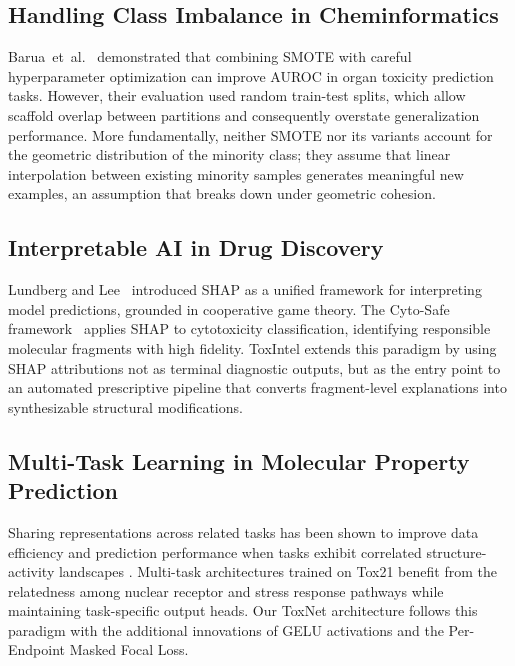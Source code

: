 \documentclass[lettersize,journal]{IEEEtran}
\begin{document}
  \subsection{Handling Class Imbalance in Cheminformatics}
  Barua~et~al.~\cite{barua} demonstrated that combining SMOTE with careful
  hyperparameter optimization can improve AUROC in organ toxicity prediction tasks.
  However, their evaluation used random train-test splits, which allow scaffold
  overlap between partitions and consequently overstate generalization performance.
  More fundamentally, neither SMOTE nor its variants account for the geometric
  distribution of the minority class; they assume that linear interpolation
  between existing minority samples generates meaningful new examples,
  an assumption that breaks down under geometric cohesion.

  \subsection{Interpretable AI in Drug Discovery}
  Lundberg and Lee~\cite{lundberg2017} introduced SHAP as a unified framework for
  interpreting model predictions, grounded in cooperative game theory.
  The Cyto-Safe framework~\cite{feitosa} applies SHAP to cytotoxicity classification,
  identifying responsible molecular fragments with high fidelity.
  ToxIntel extends this paradigm by using SHAP attributions not as terminal
  diagnostic outputs, but as the entry point to an automated prescriptive pipeline
  that converts fragment-level explanations into synthesizable structural
  modifications.

\subsection{Multi-Task Learning in Molecular Property Prediction}
Sharing representations across related tasks has been shown to improve data
efficiency and prediction performance when tasks exhibit correlated structure-activity
landscapes \cite{ramsundar2015,zhang2025}.
Multi-task architectures trained on Tox21 benefit from the relatedness among
nuclear receptor and stress response pathways while maintaining task-specific
output heads.
Our ToxNet architecture follows this paradigm with the additional innovations of
GELU activations and the Per-Endpoint Masked Focal Loss.

\end{document}
